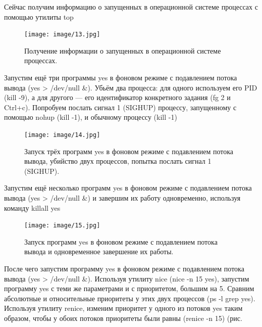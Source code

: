 \documentclass[
  english,
  russian,
  12pt,
  a4paper,
  DIV=11,
  numbers=noendperiod]{scrreprt}
\begin{document}
Сейчас получим информацию о запущенных в операционной системе процессах
с помощью утилиты top

\begin{figure}

{\centering \texttt{[image: image/13.jpg]}

}

\caption{Получение информации о запущенных в операционной системе
процессах.}

\end{figure}%

Запустим ещё три программы yes в фоновом режиме с подавлением потока
вывода (yes \textgreater{} /dev/null \&). Убьём два процесса: для одного
используем его PID (kill -9), а для другого --- его идентификатор
конкретного задания (fg 2 и Ctrl+c). Попробуем послать сигнал 1 (SIGHUP)
процессу, запущенному с помощью nohup (kill -1), и обычному процессу
(kill -1)

\begin{figure}

{\centering \texttt{[image: image/14.jpg]}

}

\caption{Запуск трёх программ yes в фоновом режиме с подавлением потока
вывода, убийство двух процессов, попытка послать сигнал 1 (SIGHUP).}

\end{figure}%

Запустим ещё несколько программ yes в фоновом режиме с подавлением
потока вывода (yes \textgreater{} /dev/null \&) и завершим их работу
одновременно, используя команду killall yes

\begin{figure}

{\centering \texttt{[image: image/15.jpg]}

}

\caption{Запуск программ yes в фоновом режиме с подавлением потока
вывода и одновременное завершение их работы.}

\end{figure}%

После чего запустим программу yes в фоновом режиме с подавлением потока
вывода (yes \textgreater{} /dev/null \&). Используя утилиту nice (nice
-n 15 yes), запустим программу yes с теми же параметрами и с
приоритетом, большим на 5. Сравним абсолютные и относительные приоритеты
у этих двух процессов (ps -l \textbar{} grep yes). Используя утилиту
renice, изменим приоритет у одного из потоков yes таким образом, чтобы у
обоих потоков приоритеты были равны (renice -n 15) (рис.
\end{document}
